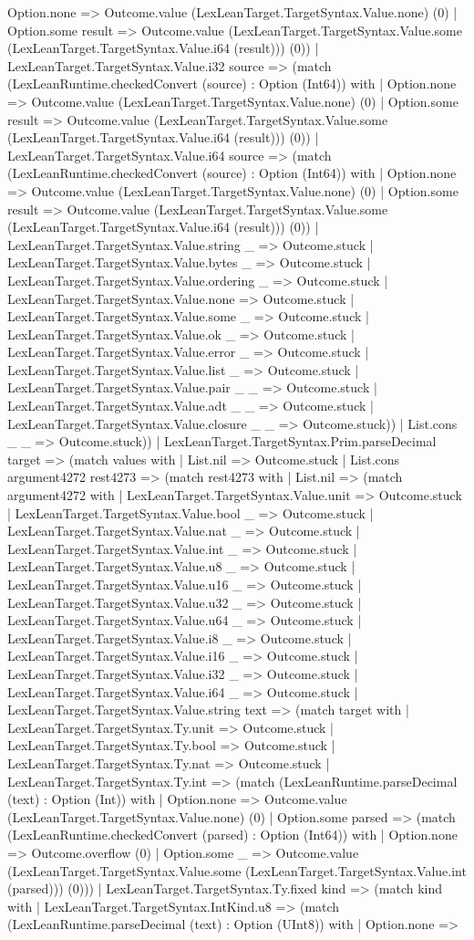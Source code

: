 \documentclass[11pt]{article}
\begin{document}
Option.none => Outcome.value (LexLeanTarget.TargetSyntax.Value.none) (0) | Option.some result => Outcome.value (LexLeanTarget.TargetSyntax.Value.some (LexLeanTarget.TargetSyntax.Value.i64 (result))) (0)) | LexLeanTarget.TargetSyntax.Value.i32 source => (match (LexLeanRuntime.checkedConvert (source) : Option (Int64)) with | Option.none => Outcome.value (LexLeanTarget.TargetSyntax.Value.none) (0) | Option.some result => Outcome.value (LexLeanTarget.TargetSyntax.Value.some (LexLeanTarget.TargetSyntax.Value.i64 (result))) (0)) | LexLeanTarget.TargetSyntax.Value.i64 source => (match (LexLeanRuntime.checkedConvert (source) : Option (Int64)) with | Option.none => Outcome.value (LexLeanTarget.TargetSyntax.Value.none) (0) | Option.some result => Outcome.value (LexLeanTarget.TargetSyntax.Value.some (LexLeanTarget.TargetSyntax.Value.i64 (result))) (0)) | LexLeanTarget.TargetSyntax.Value.string \_ => Outcome.stuck | LexLeanTarget.TargetSyntax.Value.bytes \_ => Outcome.stuck | LexLeanTarget.TargetSyntax.Value.ordering \_ => Outcome.stuck | LexLeanTarget.TargetSyntax.Value.none => Outcome.stuck | LexLeanTarget.TargetSyntax.Value.some \_ => Outcome.stuck | LexLeanTarget.TargetSyntax.Value.ok \_ => Outcome.stuck | LexLeanTarget.TargetSyntax.Value.error \_ => Outcome.stuck | LexLeanTarget.TargetSyntax.Value.list \_ => Outcome.stuck | LexLeanTarget.TargetSyntax.Value.pair \_ \_ => Outcome.stuck | LexLeanTarget.TargetSyntax.Value.adt \_ \_ => Outcome.stuck | LexLeanTarget.TargetSyntax.Value.closure \_ \_ => Outcome.stuck)) | List.cons \_ \_ => Outcome.stuck)) | LexLeanTarget.TargetSyntax.Prim.parseDecimal target => (match values with | List.nil => Outcome.stuck | List.cons argument4272 rest4273 => (match rest4273 with | List.nil => (match argument4272 with | LexLeanTarget.TargetSyntax.Value.unit => Outcome.stuck | LexLeanTarget.TargetSyntax.Value.bool \_ => Outcome.stuck | LexLeanTarget.TargetSyntax.Value.nat \_ => Outcome.stuck | LexLeanTarget.TargetSyntax.Value.int \_ => Outcome.stuck | LexLeanTarget.TargetSyntax.Value.u8 \_ => Outcome.stuck | LexLeanTarget.TargetSyntax.Value.u16 \_ => Outcome.stuck | LexLeanTarget.TargetSyntax.Value.u32 \_ => Outcome.stuck | LexLeanTarget.TargetSyntax.Value.u64 \_ => Outcome.stuck | LexLeanTarget.TargetSyntax.Value.i8 \_ => Outcome.stuck | LexLeanTarget.TargetSyntax.Value.i16 \_ => Outcome.stuck | LexLeanTarget.TargetSyntax.Value.i32 \_ => Outcome.stuck | LexLeanTarget.TargetSyntax.Value.i64 \_ => Outcome.stuck | LexLeanTarget.TargetSyntax.Value.string text => (match target with | LexLeanTarget.TargetSyntax.Ty.unit => Outcome.stuck | LexLeanTarget.TargetSyntax.Ty.bool => Outcome.stuck | LexLeanTarget.TargetSyntax.Ty.nat => Outcome.stuck | LexLeanTarget.TargetSyntax.Ty.int => (match (LexLeanRuntime.parseDecimal (text) : Option (Int)) with | Option.none => Outcome.value (LexLeanTarget.TargetSyntax.Value.none) (0) | Option.some parsed => (match (LexLeanRuntime.checkedConvert (parsed) : Option (Int64)) with | Option.none => Outcome.overflow (0) | Option.some \_ => Outcome.value (LexLeanTarget.TargetSyntax.Value.some (LexLeanTarget.TargetSyntax.Value.int (parsed))) (0))) | LexLeanTarget.TargetSyntax.Ty.fixed kind => (match kind with | LexLeanTarget.TargetSyntax.IntKind.u8 => (match (LexLeanRuntime.parseDecimal (text) : Option (UInt8)) with | Option.none => 
\end{document}
